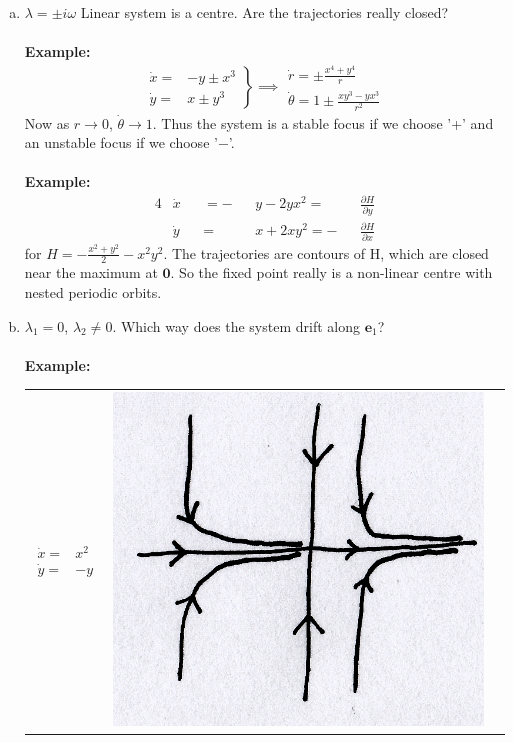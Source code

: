 \documentclass{article}
\newcommand{\example}{\textbf{Example:}}                    %
\begin{document}
\begin{enumerate}[(a)]
\item $\lambda = \pm i \omega$ Linear system is a centre. Are the trajectories
really closed?
\\
\\
\example\
\[ \left. \begin{array}{lr} 
				\dot{x} = & - y \pm x^3 \\
				\dot{y} = & x \pm y^3
\end{array} \right\} \implies \begin{array}{lr}
				\dot{r} = \pm \frac{x^4+y^4}{r} \\
			\dot{\theta} = 1 \pm \frac{xy^3-yx^3}{r^2} \end{array}\]
Now as $r \to 0$, $\dot{\theta} \to 1$. Thus the system is a stable focus if we choose '+'
and an unstable focus if we choose '$-$'.
\\
\\
\example\
\begin{alignat*}{4} 
& \dot{x} &&=  - && y - 2yx^2 =  &&\frac{\partial H}{\partial y} \\
& \dot{y} &&=    && x + 2xy^2 = -&&\frac{\partial H}{\partial x} 
\end{alignat*} 
for $\displaystyle H = - \frac{x^2+y^2}{2} - x^2y^2$. 
The trajectories are contours of H, which are closed near the maximum at 
$\bm{0}$. So the fixed point really is a non-linear centre with nested 
periodic orbits.
%
\item $\lambda_1 = 0$, $\lambda_2 \neq 0$. Which way does the system drift 
along $\bm{e}_1$?
\\
\\
\example\ \\ 
\begin{center}
\begin{tabular}{ m{3cm} m{3cm} m{3cm}  } 
$\begin{array}{lr}
 \dot{x} = & x^2 \\
 \dot{y} = & -y \end{array}$
& \includegraphics[scale=0.1]{fig15.png}

\end{tabular}
\end{center}
\end{enumerate}
\end{document}
